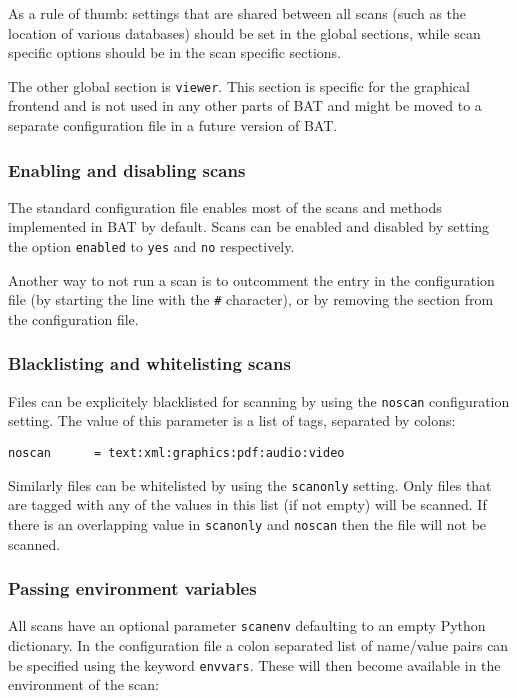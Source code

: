 \documentclass[10pt]{article}
\begin{document}
As a rule of thumb: settings that are shared between all scans (such as the
location of various databases) should be set in the global sections, while scan
specific options should be in the scan specific sections.

The other global section is \texttt{viewer}. This section is specific for the
graphical frontend and is not used in any other parts of BAT and might be moved
to a separate configuration file in a future version of BAT.

\subsubsection{Enabling and disabling scans}

The standard configuration file enables most of the scans and methods
implemented in BAT by default. Scans can be enabled and disabled by setting the
option \texttt{enabled} to \texttt{yes} and \texttt{no} respectively.

Another way to not run a scan is to outcomment the entry in the configuration
file (by starting the line with the \texttt{\#} character), or by removing the
section from the configuration file.

\subsubsection{Blacklisting and whitelisting scans}

Files can be explicitely blacklisted for scanning by using the \texttt{noscan}
configuration setting. The value of this parameter is a list of tags, separated
by colons:

\begin{verbatim}
noscan      = text:xml:graphics:pdf:audio:video
\end{verbatim}

Similarly files can be whitelisted by using the \texttt{scanonly} setting. Only
files that are tagged with any of the values in this list (if not empty) will
be scanned. If there is an overlapping value in \texttt{scanonly} and
\texttt{noscan} then the file will not be scanned.

\subsubsection{Passing environment variables}

All scans have an optional parameter \texttt{scanenv} defaulting to an empty
Python dictionary. In the configuration file a colon separated list of
name/value pairs can be specified using the keyword \texttt{envvars}. These will
then become available in the environment of the scan:
\end{document}
